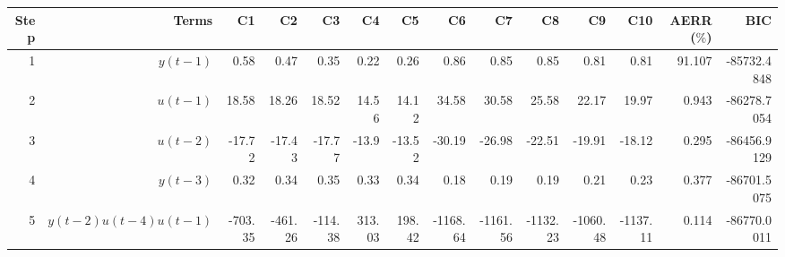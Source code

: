 \begin{tabular}{rrrrrrrrrrrrrr}
Step & Terms & C1 & C2 & C3 & C4 & C5 & C6 & C7 & C8 & C9 & C10 & AERR($\%$) & BIC \\ 
\hline 
1 & $y(t-1)$ & 0.58 & 0.47 & 0.35 & 0.22 & 0.26 & 0.86 & 0.85 & 0.85 & 0.81 & 0.81 & 91.107 & -85732.4848 \\ 
2 & $u(t-1)$ & 18.58 & 18.26 & 18.52 & 14.56 & 14.12 & 34.58 & 30.58 & 25.58 & 22.17 & 19.97 & 0.943 & -86278.7054 \\ 
3 & $u(t-2)$ & -17.72 & -17.43 & -17.77 & -13.9 & -13.52 & -30.19 & -26.98 & -22.51 & -19.91 & -18.12 & 0.295 & -86456.9129 \\ 
4 & $y(t-3)$ & 0.32 & 0.34 & 0.35 & 0.33 & 0.34 & 0.18 & 0.19 & 0.19 & 0.21 & 0.23 & 0.377 & -86701.5075 \\ 
5 & $y(t-2)u(t-4)u(t-1)$ & -703.35 & -461.26 & -114.38 & 313.03 & 198.42 & -1168.64 & -1161.56 & -1132.23 & -1060.48 & -1137.11 & 0.114 & -86770.0011 \\ 
\hline 
\end{tabular}